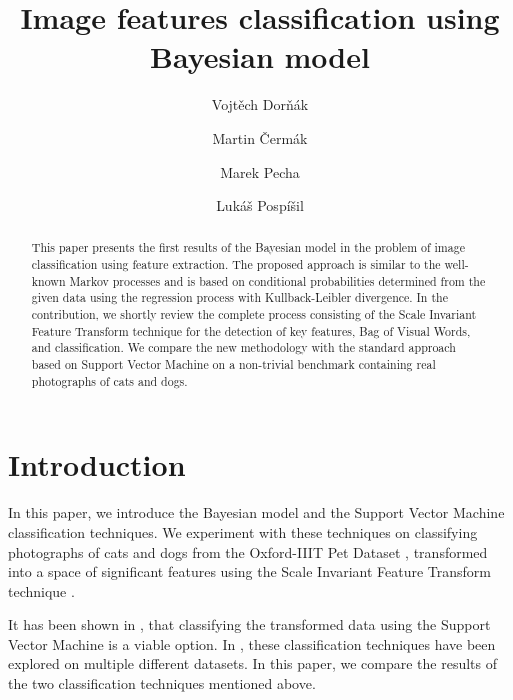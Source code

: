\documentclass{aip-cp}
\begin{document}
\title{Image features classification using Bayesian model}

\author[aff1,aff2]{Vojt\v{e}ch Dor\v{n}\'{a}k}
\author[aff1,aff2]{Martin \v{C}erm\'{a}k}
\author[aff2]{Marek Pecha}
\author[aff1]{Luk\'{a}\v{s} Posp\'{i}\v{s}il}


\maketitle

\begin{abstract}
    This paper presents the first results of the Bayesian model in the problem of image classification using feature extraction. The proposed approach is similar to the well-known Markov processes and is based on conditional probabilities determined from the given data using the regression process with Kullback-Leibler divergence. In the contribution, we shortly review the complete process consisting of the Scale Invariant Feature Transform technique for the detection of key features, Bag of Visual Words, and classification. We compare the new methodology with the standard approach based on Support Vector Machine on a non-trivial benchmark containing real photographs of cats and dogs.
\end{abstract}

\maketitle

\section{Introduction}
In this paper, we introduce the Bayesian model and the Support Vector Machine classification techniques. We experiment with these techniques on classifying photographs of cats and dogs from the Oxford-IIIT Pet Dataset \cite{parkhi12a}, transformed into a space of significant features using the Scale Invariant Feature Transform technique \cite{Lowe2004}.

It has been shown in \cite{dornak2020}, that classifying the transformed data using the Support Vector Machine is a viable option. In \cite{dornak2021}, these classification techniques have been explored on multiple different datasets. In this paper, we compare the results of the two classification techniques mentioned above.
\end{document}

